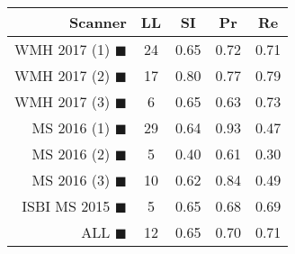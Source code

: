 \begin{tabular}{rcccc}
\toprule
Scanner & LL & SI & Pr & Re \\
\midrule
WMH 2017 (1) {\color[rgb]{ 1.00 0.00 0.00}$\blacksquare$} & 24 & 0.65 & 0.72 & 0.71 \\
WMH 2017 (2) {\color[rgb]{ 1.00 0.50 0.00}$\blacksquare$} & 17 & 0.80 & 0.77 & 0.79 \\
WMH 2017 (3) {\color[rgb]{ 1.00 0.80 0.00}$\blacksquare$} & 6 & 0.65 & 0.63 & 0.73 \\
MS  2016 (1) {\color[rgb]{ 0.20 0.80 0.00}$\blacksquare$} & 29 & 0.64 & 0.93 & 0.47 \\
MS  2016 (2) {\color[rgb]{ 0.00 0.40 1.00}$\blacksquare$} & 5 & 0.40 & 0.61 & 0.30 \\
MS  2016 (3) {\color[rgb]{ 0.60 0.00 1.00}$\blacksquare$} & 10 & 0.62 & 0.84 & 0.49 \\
ISBI MS 2015 {\color[rgb]{ 1.00 0.00 1.00}$\blacksquare$} & 5 & 0.65 & 0.68 & 0.69 \\
\midrule
ALL {\color[rgb]{ 1.00 1.00 1.00}$\blacksquare$} & 12 & 0.65 & 0.70 & 0.71 \\
\bottomrule
\end{tabular}